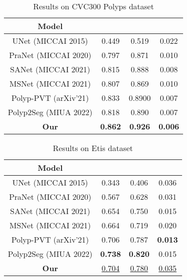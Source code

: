 \documentclass[conference]{IEEEtran}
\begin{document}
\begin{table}[H]
\begin{center}
\begin{tabular}{|c| c | c| c|} 
 \hline
 Model &  &  &  \\ [0.5ex] 
 \hline
 UNet (MICCAI 2015) \cite{unet} & 0.449 & 0.519 & 0.022 \\


 PraNet (MICCAI 2020) \cite{pranet}  & 0.797 & 0.871 & 0.010 \\


SANet (MICCAI 2021) \cite{sanet} &0.815 & 0.888 & 0.008 \\

MSNet (MICCAI 2021) \cite{MSNet} & 0.807 & 0.869 & 0.010 \\

Polyp-PVT (arXiv'21) \cite{pvt} &  0.833 & 0.8900 & 0.007\\



Polyp2Seg (MIUA 2022) \cite{polyp2seg} & 0.818 & 0.890 & 0.007\\

\hline

\textbf{Our} & \textbf{0.862} & \textbf{0.926} & \textbf{0.006} \\

 \hline
\end{tabular}
\end{center}
\caption{Results on CVC300 Polyps dataset \cite{cvc300}}
\label{tab:tab2}
\end{table}

\begin{table}[H]
\begin{center}
\begin{tabular}{|c| c | c| c|} 
 \hline
 Model &  &  &  \\ [0.5ex] 
 \hline
 UNet (MICCAI 2015) \cite{unet} & 0.343 & 0.406 & 0.036 \\


 PraNet (MICCAI 2020) \cite{pranet}  & 0.567 & 0.628 & 0.031 \\


SANet (MICCAI 2021) \cite{sanet} & 0.654 & 0.750 & 0.015 \\

MSNet (MICCAI 2021) \cite{MSNet} & 0.664 & 0.719 & 0.020 \\

Polyp-PVT (arXiv'21) \cite{pvt} &  0.706 & 0.787 & \textbf{0.013}\\


Polyp2Seg (MIUA 2022) \cite{polyp2seg} & \textbf{0.738} & \textbf{0.820} & 0.015\\
\hline

\textbf{Our} & \underline{0.704} & \underline{0.780} & \underline{0.035} \\

 \hline
\end{tabular}
\end{center}
\caption{Results on Etis dataset \cite{etis}}
\label{tab:tab3}
\end{table}
\end{document}
